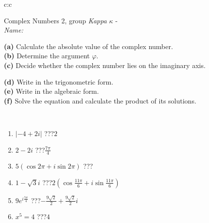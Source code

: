 \documentclass[10pt]{report}
\begin{document}
\newpage
\thispagestyle{empty}
\begin{tabular}{c:c}
\begin{minipage}[c][104.5mm][t]{0.5\linewidth}
\begin{center}
\vspace{5mm}
{\huge Complex Numbers 2, group \textit{Kappa $\kappa$} -}\\[5mm]
\textit{Name:}\phantom{xxxxxxxxxxxxxxxxxxxxxxxxxxxxxxxxxxxxxxxxxxxxxxxxxxxxxxxxxxxxxxxxx}\\[5mm]
\begin{minipage}{0.95\linewidth}
\begin{center}
{\small \begin{minipage}{0.44\textwidth} \raggedright
\textbf{(a)} Calculate the absolute value of the complex number. \\[1mm]
\textbf{(b)} Determine the argument \(\varphi\). \\[1mm]
\textbf{(c)} Decide whether the complex number lies on the imaginary axis. \end{minipage} \begin{minipage}{0.54\textwidth}
\textbf{(d)} Write in the trigonometric form. \\[1mm]
\textbf{(e)} Write in the algebraic form. \\[1mm]
\textbf{(f)} Solve the equation and calculate the product of its solutions.
\end{minipage}
}
\end{center}
\end{minipage}
\\[1mm]
\begin{minipage}{0.79\linewidth}
\begin{center}
\begin{varwidth}{\linewidth}
\setlength{\itemsep}{0pt}
\begin{enumerate}
\large
\item $|-4+2i|$\quad \dotfill\; ???\;\dotfill \quad $2$
\item $2-2i$\quad \dotfill\; ???\;\dotfill \quad $\frac{7\pi}{4}$
\item $5\left(\cos{2\pi}+i\sin{2\pi}\right)$\quad \dotfill\; ???\;\dotfill \quad {}
\item $1-\sqrt{3}i$\quad \dotfill\; ???\;\dotfill \quad $2\left(\cos{\frac{11\pi}{6}}+i\sin{\frac{11\pi}{6}}\right)$
\item $9e^{i\frac{5\pi}{4}}$\quad \dotfill\; ???\;\dotfill \quad $-\frac{9\sqrt{2}}{2}+\frac{9\sqrt{2}}{2}i$
\item $x^5=4$\quad \dotfill\; ???\;\dotfill \quad $4$

\end{enumerate}
\end{varwidth}
\end{center}
\end{minipage}
\end{center}
\end{minipage}
\end{tabular}
\end{document}

